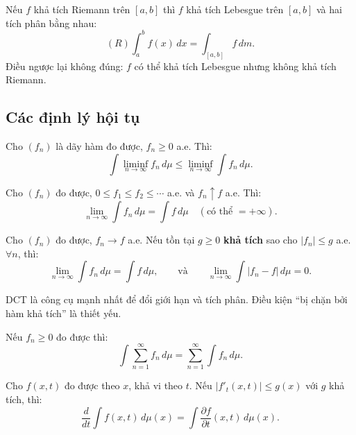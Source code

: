 \documentclass[12pt,a4paper]{article}
\begin{document}
\begin{dinhly}[title={So sánh Riemann và Lebesgue}]
  Nếu $f$ khả tích Riemann trên $[a, b]$ thì $f$ khả tích Lebesgue trên $[a, b]$ và hai tích phân bằng nhau:
  \[
    (R)\!\int_a^b f(x)\,dx = \int_{[a,b]} f\,dm.
  \]
  Điều ngược lại không đúng: $f$ có thể khả tích Lebesgue nhưng không khả tích Riemann.
\end{dinhly}

\subsection{Các định lý hội tụ}

\begin{dinhly}[title={Bổ đề Fatou}]
  Cho $(f_n)$ là dãy hàm đo được, $f_n \ge 0$ a.e. Thì:
  \[
    \int \liminf_{n \to \infty} f_n\,d\mu \le \liminf_{n \to \infty} \int f_n\,d\mu.
  \]
\end{dinhly}

\begin{dinhly}[title={Định lý hội tụ đơn điệu (MCT --- Beppo Levi)}]
  Cho $(f_n)$ đo được, $0 \le f_1 \le f_2 \le \cdots$ a.e. và $f_n \uparrow f$ a.e. Thì:
  \[
    \lim_{n \to \infty} \int f_n\,d\mu = \int f\,d\mu \quad(\text{có thể } = +\infty).
  \]
\end{dinhly}

\begin{dinhly}[title={Định lý hội tụ bị chặn (DCT --- Lebesgue)}]
  Cho $(f_n)$ đo được, $f_n \to f$ a.e. Nếu tồn tại $g \ge 0$ \textbf{khả tích} sao cho $|f_n| \le g$ a.e. $\forall n$, thì:
  \[
    \lim_{n \to \infty} \int f_n\,d\mu = \int f\,d\mu, \qquad\text{và}\qquad \lim_{n \to \infty}\int |f_n - f|\,d\mu = 0.
  \]
\end{dinhly}

\begin{luuy}
  DCT là công cụ mạnh nhất để đổi giới hạn và tích phân. Điều kiện ``bị chặn bởi hàm khả tích'' là thiết yếu.
\end{luuy}

\begin{dinhly}[title={Hệ quả: chuỗi hàm}]
  Nếu $f_n \ge 0$ đo được thì:
  \[
    \int \sum_{n=1}^{\infty} f_n\,d\mu = \sum_{n=1}^{\infty} \int f_n\,d\mu.
  \]
\end{dinhly}

\begin{dinhly}[title={Đạo hàm dưới dấu tích phân}]
  Cho $f(x, t)$ đo được theo $x$, khả vi theo $t$. Nếu $|f'_t(x, t)| \le g(x)$ với $g$ khả tích, thì:
  \[
    \frac{d}{dt}\int f(x, t)\,d\mu(x) = \int \frac{\partial f}{\partial t}(x, t)\,d\mu(x).
  \]
\end{dinhly}
\end{document}
